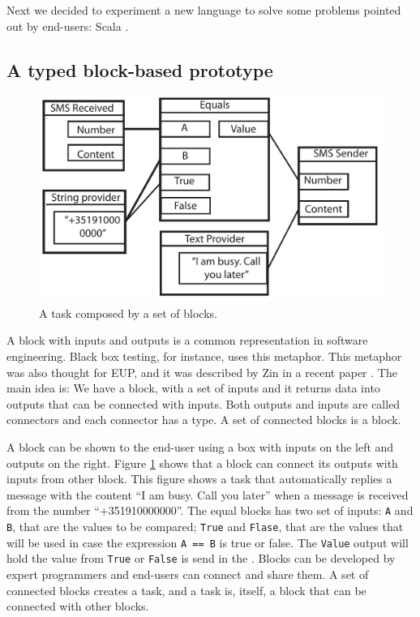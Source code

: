 \documentclass[9pt,a4paper]{extarticle}
\begin{document}
\begin{multicols}{2}
Next we decided to experiment a new language to solve some problems pointed out by end-users: Scala \cite{ProgrammingScala}.

\subsection{A typed block-based prototype}

\begin{figure}[H]
\centerline{\includegraphics[scale=.43]{block_example.pdf}}
\label{fig:block}
\caption{A task composed by a set of blocks.} 
\end{figure}

A block with inputs and outputs is a common representation in software engineering. 
Black box testing, for instance, uses this metaphor. 
This metaphor was also thought for EUP, and it was described by Zin in a recent paper \cite{Zin2011}. 
The main idea is: We have a block, with a set of inputs and it returns data into outputs that can be connected with inputs.
Both outputs and inputs are called connectors and each connector has a type. A set of connected blocks is a block. 

A block  can be shown to the end-user using a box with inputs on the left and outputs on the right. 
Figure \ref{fig:block} shows that a block can connect its outputs with inputs from other block. This figure shows a task that automatically replies a message with the content ``I am busy. Call you later'' when a message is received from the number ``+351910000000''. The equal blocks has two set of inputs: \texttt{A} and  \texttt{B}, that are the values to be compared; \texttt{True} and  \texttt{Flase},
that are the values that will be used in case the expression \texttt{A == B} is true or false. The \texttt{Value} output will hold the value from  \texttt{True} or  \texttt{False} is send in the  .
Blocks can be developed by expert programmers and end-users can connect and share them. 
A set of connected blocks creates a task, and a task is, itself, a block that can be connected with other blocks.


\end{multicols}
\end{document}
